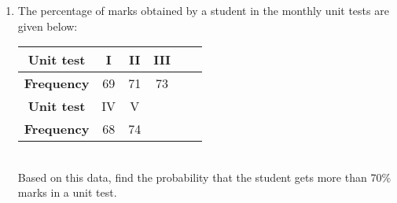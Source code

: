 \renewcommand{\theequation}{\theenumi}
\begin{enumerate}[label=\arabic*.,ref=\thesubsection.\theenumi]
\item The percentage of marks obtained by a student in the monthly unit tests are given below:\\

\begin{tabular}{ |c|c|c|c|c|c| } 
	\hline
	\textbf{Unit test} &I &II &III \\ 
	\hline
	\textbf{Frequency }&69 &71 &73 \\ 
	\hline
	\textbf{Unit test} &IV &V& \\ 
	\hline
	\textbf{Frequency } &68 &74&\\ 
	\hline
\end{tabular}\\

Based on this data, find the probability that the student gets more than 70$\%$ marks in a unit test.
\end{enumerate}